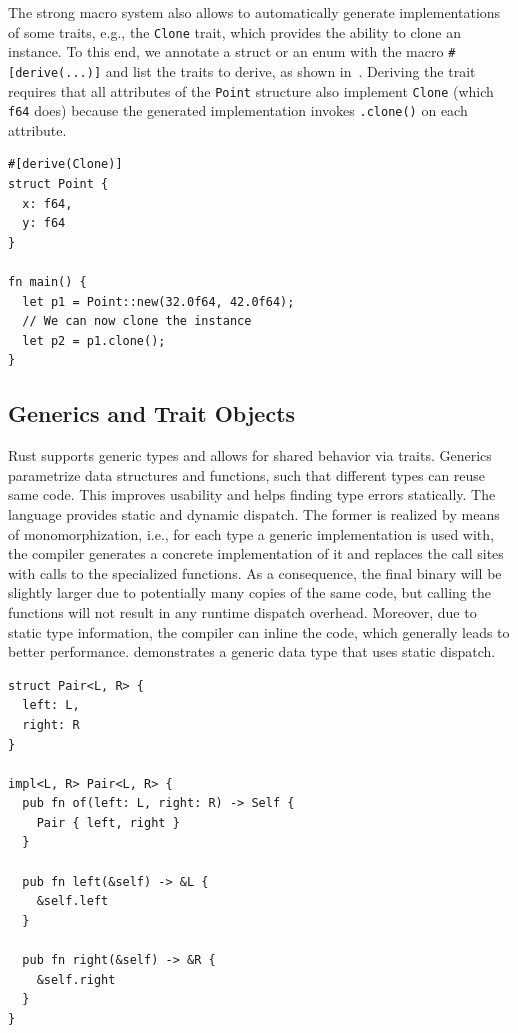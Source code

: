 \documentclass[paper=a4,%
  twoside,%
  BCOR4mm,%
  abstract=true,%
  toc=bibliography,%
  chapterprefix=true,%
  toc=bibliographynumbered,%
  open=right,%
  english,%
  pagesize=pdftex]{scrreprt}
\begin{document}
The strong macro system also allows to automatically generate implementations of some traits, e.g., the \texttt{Clone} trait, which provides the ability to clone an instance. To this end, we annotate a struct or an enum with the macro \texttt{\#[derive(...)]} and list the traits to derive, as shown in~. Deriving the trait requires that all attributes of the \texttt{Point} structure also implement \texttt{Clone} (which \texttt{f64} does) because the generated implementation invokes \texttt{.clone()} on each attribute.

\begin{lstlisting}[style=boxed, caption={The compiler automatically generates an implementation of the \texttt{Clone} trait for the \texttt{Point} data type}, label=lst:example-derive]
#[derive(Clone)]
struct Point {
  x: f64,
  y: f64
}

fn main() {
  let p1 = Point::new(32.0f64, 42.0f64);
  // We can now clone the instance
  let p2 = p1.clone();
}
\end{lstlisting}


\subsection{Generics and Trait Objects}
Rust supports generic types and allows for shared behavior via traits. Generics parametrize data structures and functions, such that different types can reuse same code. This improves usability and helps finding type errors statically. The language provides static and dynamic dispatch. The former is realized by means of monomorphization, i.e., for each type a generic implementation is used with, the compiler generates a concrete implementation of it and replaces the call sites with calls to the specialized functions. As a consequence, the final binary will be slightly larger due to potentially many copies of the same code, but calling the functions will not result in any runtime dispatch overhead. Moreover, due to static type information, the compiler can inline the code, which generally leads to better performance.  demonstrates a generic data type that uses static dispatch.

\begin{lstlisting}[style=boxed, caption={A data type with static dispatch via monomorphization}, label=lst:static-dispatch]
struct Pair<L, R> {
  left: L,
  right: R
}

impl<L, R> Pair<L, R> {
  pub fn of(left: L, right: R) -> Self {
    Pair { left, right }
  }

  pub fn left(&self) -> &L {
    &self.left
  }

  pub fn right(&self) -> &R {
    &self.right
  }
}
\end{lstlisting}
\end{document}
